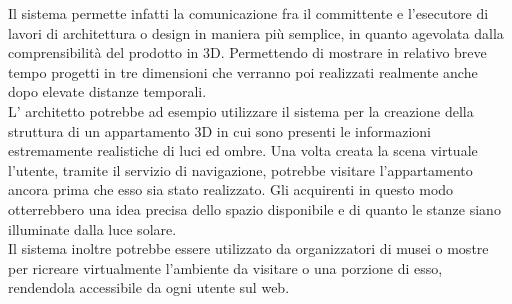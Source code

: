 Il sistema permette infatti la comunicazione fra il committente e l’esecutore di lavori di architettura o design in maniera più semplice, in quanto agevolata dalla comprensibilità del prodotto in 3D. Permettendo di mostrare in relativo breve tempo progetti in tre dimensioni che verranno poi realizzati realmente anche dopo elevate distanze temporali.
\\
L' architetto potrebbe ad esempio utilizzare il sistema per la creazione della struttura di un appartamento 3D in cui sono presenti le informazioni estremamente realistiche di luci ed ombre.
Una volta creata la scena virtuale l’utente, tramite il servizio di navigazione, potrebbe visitare l’appartamento ancora prima che esso sia stato realizzato.
Gli acquirenti in questo modo otterrebbero una idea precisa dello spazio disponibile e di quanto le stanze siano illuminate dalla luce solare. 
\\
Il sistema inoltre potrebbe essere utilizzato da organizzatori di musei o mostre per ricreare virtualmente  l’ambiente da visitare o una porzione di esso, rendendola accessibile da ogni utente sul web. 

